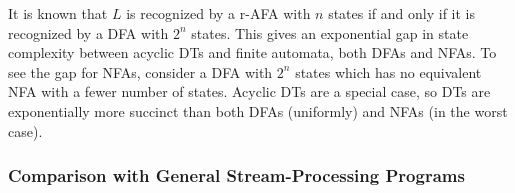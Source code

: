 It is known \cite{chandra1981alternation,fellah1990constructions} that $L$ is recognized by a r-AFA with $n$ states if and only if it is recognized by a DFA with $2^n$ states. This gives an exponential gap in state complexity between acyclic DTs and finite automata, both DFAs and NFAs. To see the gap for NFAs, consider a DFA with $2^n$ states which has no equivalent NFA with a fewer number of states. Acyclic DTs are a special case, so DTs are exponentially more succinct than both DFAs (uniformly) and NFAs (in the worst case).

\subsubsection{Comparison with General Stream-Processing Programs}
\label{dt:subsec:dts-and-spp}


\newcommand{\Stream}{\textsc{Stream}}

